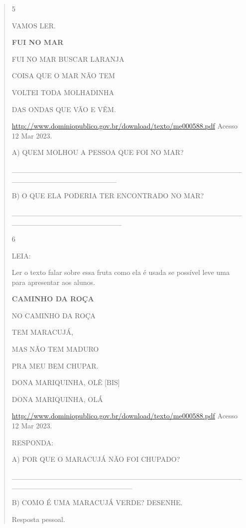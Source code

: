 \begin{verse}
{\protect\hypertarget{_heading=h.cx2waide4olu}{}{}

\num{5}

VAMOS LER.

\textbf{FUI NO MAR}

FUI NO MAR BUSCAR LARANJA

COISA QUE O MAR NÃO TEM

VOLTEI TODA MOLHADINHA

DAS ONDAS QUE VÃO E VÊM.

\url{http://www.dominiopublico.gov.br/download/texto/me000588.pdf}
Acesso 12 Mar 2023.

A) QUEM MOLHOU A PESSOA QUE FOI NO MAR?

\_\_\_\_\_\_\_\_\_\_\_\_\_\_\_\_\_\_\_\_\_\_\_\_\_\_\_\_\_\_\_\_\_\_\_\_\_\_\_\_\_\_\_\_\_\_\_\_\_\_\_\_\_\_\_\_\_\_\_\_\_\_\_\_


B) O QUE ELA PODERIA TER ENCONTRADO NO MAR?

\_\_\_\_\_\_\_\_\_\_\_\_\_\_\_\_\_\_\_\_\_\_\_\_\_\_\_\_\_\_\_\_\_\_\_\_\_\_\_\_\_\_\_\_\_\_\_\_\_\_\_\_\_\_\_\_\_\_\_\_\_\_\_\_\_


\num{6}

LEIA:

Ler o texto falar sobre essa fruta como ela é usada se possível leve uma
para apresentar aos alunos.

\textbf{CAMINHO DA ROÇA}

NO CAMINHO DA ROÇA

TEM MARACUJÁ,

MAS NÃO TEM MADURO

PRA MEU BEM CHUPAR.

DONA MARIQUINHA, OLÊ {[}BIS{]}

DONA MARIQUINHA, OLÁ

\url{http://www.dominiopublico.gov.br/download/texto/me000588.pdf}
Acesso 12 Mar 2023.

RESPONDA:

A) POR QUE O MARACUJÁ NÃO FOI CHUPADO?

\_\_\_\_\_\_\_\_\_\_\_\_\_\_\_\_\_\_\_\_\_\_\_\_\_\_\_\_\_\_\_\_\_\_\_\_\_\_\_\_\_\_\_\_\_\_\_\_\_\_\_\_\_\_\_\_\_\_\_\_\_\_\_\_\_\_\_


B) COMO É UMA MARACUJÁ VERDE? DESENHE.

Resposta pessoal.

}
\end{verse}
